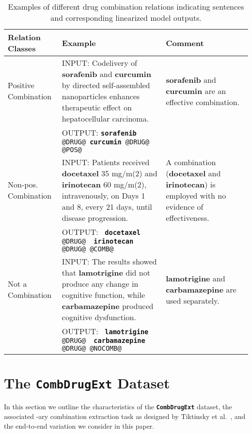\documentclass[conference]{IEEEtran}
\begin{document}
\begin{table*}[t]
\renewcommand{\arraystretch}{1.2}
\centering
\caption{Examples of different drug combination relations indicating sentences and corresponding linearized model outputs.}

\label{fig:complexities}

\begin{tabular}{p{} p{} p{}}
\toprule
Relation Classes &
  Example &
  Comment \\ \midrule
  \multirow{3.5}{*}{Positive Combination  } &
  INPUT: Codelivery of \textbf{sorafenib} and \textbf{curcumin} by directed self-assembled nanoparticles enhances therapeutic effect on hepatocellular carcinoma. &
  \multirow{3.5}{*}{\parbox{4cm}{{\textbf{sorafenib} and \textbf{curcumin}} are an effective combination.}} \\ \cmidrule(lr){2-2}
 &
  OUTPUT: \texttt{{\textbf{sorafenib} @DRUG@} {\textbf{curcumin} @DRUG@ @POS@}}  &
   \\ \cmidrule(r){1-3}
  \multirow{3.5}{*}{Non-pos. Combination} &
  INPUT: Patients received \textbf{docetaxel} 35 mg/m(2) and \textbf{irinotecan} 60 mg/m(2), intravenously, on Days 1 and 8, every 21 days, until disease progression. &
  \multirow{3.5}{*}{\parbox{4cm}{A combination (\textbf{docetaxel} and \textbf{irinotecan}) is employed with no evidence of effectiveness.}} \\ \cmidrule(lr){2-2}
 &
   OUTPUT: \texttt{{ \textbf{docetaxel}}  { @DRUG@} { \textbf{irinotecan} @DRUG@} @COMB@} &
   \\ \cmidrule(r){1-3}
   
\multirow{3.5}{*}{Not a Combination} &
  INPUT: The results showed that \textbf{lamotrigine} did not produce any change in cognitive function, while \textbf{carbamazepine} produced cognitive dysfunction. &
  \multirow{3.5}{*}{\parbox{4cm}{\textbf{lamotrigine} and \textbf{carbamazepine} are used separately.}} \\ \cmidrule(lr){2-2}
 &
   OUTPUT: \texttt{{ \textbf{lamotrigine} @DRUG@} { \textbf{carbamazepine} @DRUG@} @NOCOMB@} &
   \\ \bottomrule
\end{tabular}
\vspace{-3mm}
\end{table*}





\section{The \textbf{\texttt{CombDrugExt}}  Dataset}
\label{sec-data}
 In this section we outline the characteristics of the \textbf{\texttt{CombDrugExt}} dataset, the associated  -ary combination extraction task as designed by Tiktinsky et al.~\cite{tiktinsky-etal-2022-dataset}, and the end-to-end variation we consider in this paper.
 
\end{document}
